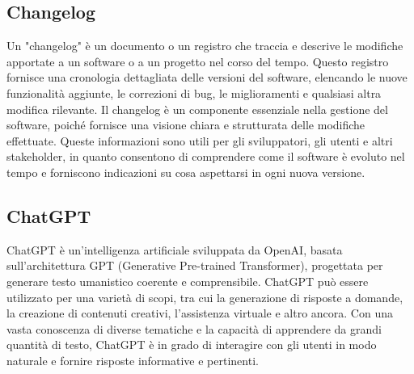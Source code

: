 \documentclass{article}
\begin{document}
\subsection{Changelog}
Un "changelog" è un documento o un registro che traccia e descrive le modifiche apportate a un software o a un progetto nel corso del tempo. Questo registro fornisce una cronologia dettagliata delle versioni del software, elencando le nuove funzionalità aggiunte, le correzioni di bug, le miglioramenti e qualsiasi altra modifica rilevante. Il changelog è un componente essenziale nella gestione del software, poiché fornisce una visione chiara e strutturata delle modifiche effettuate. Queste informazioni sono utili per gli sviluppatori, gli utenti e altri stakeholder, in quanto consentono di comprendere come il software è evoluto nel tempo e forniscono indicazioni su cosa aspettarsi in ogni nuova versione.

\subsection{ChatGPT}
ChatGPT è un'intelligenza artificiale sviluppata da OpenAI, basata sull'architettura GPT (Generative Pre-trained Transformer), progettata per generare testo umanistico coerente e comprensibile. ChatGPT può essere utilizzato per una varietà di scopi, tra cui la generazione di risposte a domande, la creazione di contenuti creativi, l'assistenza virtuale e altro ancora. Con una vasta conoscenza di diverse tematiche e la capacità di apprendere da grandi quantità di testo, ChatGPT è in grado di interagire con gli utenti in modo naturale e fornire risposte informative e pertinenti.
\end{document}
